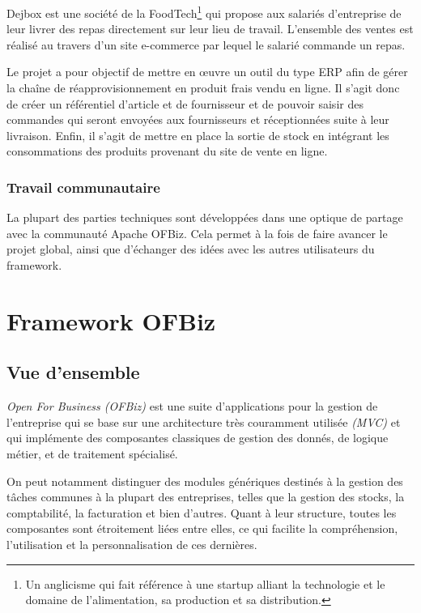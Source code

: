 Dejbox est une société de la FoodTech\footnote{Un anglicisme qui fait référence à une startup alliant la technologie et le domaine de l’alimentation, sa production et sa distribution.} qui propose aux salariés d’entreprise de leur livrer des repas directement sur leur lieu de travail. L’ensemble des ventes est réalisé au travers d’un site e-commerce par lequel le salarié commande un repas.

Le projet a pour objectif de mettre en œuvre un outil du type ERP afin de gérer la chaîne de réapprovisionnement en produit frais vendu en ligne. Il s’agit donc de créer un référentiel d’article et de fournisseur et de pouvoir saisir des commandes qui seront envoyées aux fournisseurs et réceptionnées suite à leur livraison. Enfin, il s’agit de mettre en place la sortie de stock en intégrant les consommations des produits provenant du site de vente en ligne.

\subsubsection{Travail communautaire}
La plupart des parties techniques sont développées dans une optique de partage avec la communauté Apache OFBiz. Cela permet à la fois de faire avancer le projet global, ainsi que d'échanger des idées avec les autres utilisateurs du framework.  







\section{Framework OFBiz}
\subsection{Vue d'ensemble }
\emph{Open For Business (OFBiz)} est une suite d'applications pour la gestion de l'entreprise qui se base sur une architecture très couramment utilisée \emph{(MVC)} et qui implémente des composantes classiques de gestion des donnés, de logique métier, et de traitement spécialisé. 

On peut notamment distinguer des modules génériques destinés à la gestion des tâches communes à la plupart des entreprises, telles que la gestion des stocks, la comptabilité, la facturation et bien d'autres. Quant à leur structure, toutes les composantes sont étroitement liées entre elles, ce qui facilite la compréhension, l'utilisation et la personnalisation de ces dernières. 


